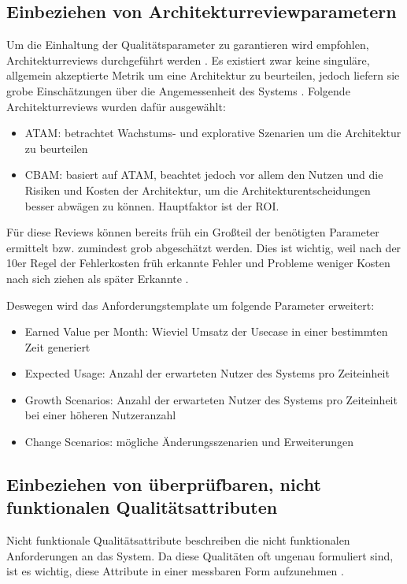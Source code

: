 \subsection{Einbeziehen von Architekturreviewparametern}
Um die Einhaltung der Qualitätsparameter zu garantieren wird empfohlen, Architekturreviews durchgeführt werden \cite[S. 20]{review}. Es existiert zwar \glqq keine singuläre, allgemein akzeptierte Metrik um eine Architektur zu beurteilen\grqq \cite[S. 19]{review}, jedoch liefern sie grobe Einschätzungen über die Angemessenheit des Systems \cite[S. 20]{review}. Folgende Architekturreviews wurden dafür ausgewählt:

\begin{itemize}
  \item ATAM: betrachtet Wachstums- und explorative Szenarien um die Architektur zu beurteilen \cite[S. 61]{review}
  \item CBAM: basiert auf ATAM, beachtet jedoch vor allem den Nutzen und die Risiken und Kosten der Architektur, um die Architekturentscheidungen besser abwägen zu können. Hauptfaktor ist der ROI. \cite[S. 67]{review}
\end{itemize}

Für diese Reviews können bereits früh ein Großteil der benötigten Parameter ermittelt bzw. zumindest grob abgeschätzt werden. Dies ist wichtig, weil nach der 10er Regel der Fehlerkosten früh erkannte Fehler und Probleme weniger Kosten nach sich ziehen als später Erkannte \cite[S. 154]{fehler}.

Deswegen wird das Anforderungstemplate um folgende Parameter erweitert:

\begin{itemize}
  \item Earned Value per Month: Wieviel Umsatz der Usecase in einer bestimmten Zeit generiert
  \item Expected Usage: Anzahl der erwarteten Nutzer des Systems pro Zeiteinheit
  \item Growth Scenarios: Anzahl der erwarteten Nutzer des Systems pro Zeiteinheit bei einer höheren Nutzeranzahl
  \item Change Scenarios: mögliche Änderungsszenarien und Erweiterungen
\end{itemize}

\subsection{Einbeziehen von überprüfbaren, nicht funktionalen Qualitätsattributen}
Nicht funktionale Qualitätsattribute beschreiben die nicht funktionalen Anforderungen an das System. Da diese Qualitäten oft ungenau formuliert sind, ist es wichtig, diese Attribute in einer messbaren Form aufzunehmen \cite[S. 9]{effektiv}.

